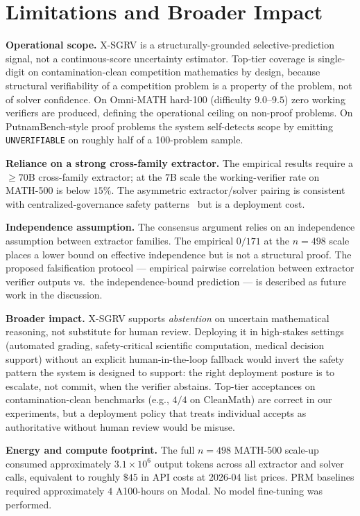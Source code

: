 \documentclass{article}
\begin{document}
\section{Limitations and Broader Impact}
\label{app:impact}

\textbf{Operational scope.} X-SGRV is a structurally-grounded selective-prediction signal, not a continuous-score uncertainty estimator. Top-tier coverage is single-digit on contamination-clean competition mathematics by design, because structural verifiability of a competition problem is a property of the problem, not of solver confidence. On Omni-MATH hard-100 (difficulty $9.0$--$9.5$) zero working verifiers are produced, defining the operational ceiling on non-proof problems. On PutnamBench-style proof problems the system self-detects scope by emitting \texttt{UNVERIFIABLE} on roughly half of a 100-problem sample.

\textbf{Reliance on a strong cross-family extractor.} The empirical results require a $\geq 70$B cross-family extractor; at the $7$B scale the working-verifier rate on MATH-500 is below $15\%$. The asymmetric extractor/solver pairing is consistent with centralized-governance safety patterns~\citep{ste2024,xiong2024llmuncertainty} but is a deployment cost.

\textbf{Independence assumption.} The consensus argument relies on an independence assumption between extractor families. The empirical $0/171$ at the $n{=}498$ scale places a lower bound on effective independence but is not a structural proof. The proposed falsification protocol --- empirical pairwise correlation between extractor verifier outputs vs.\ the independence-bound prediction --- is described as future work in the discussion.

\textbf{Broader impact.} X-SGRV supports \emph{abstention} on uncertain mathematical reasoning, not substitute for human review. Deploying it in high-stakes settings (automated grading, safety-critical scientific computation, medical decision support) without an explicit human-in-the-loop fallback would invert the safety pattern the system is designed to support: the right deployment posture is to escalate, not commit, when the verifier abstains. Top-tier acceptances on contamination-clean benchmarks (e.g., $4/4$ on CleanMath) are correct in our experiments, but a deployment policy that treats individual accepts as authoritative without human review would be misuse.

\textbf{Energy and compute footprint.} The full $n{=}498$ MATH-500 scale-up consumed approximately $3.1\times 10^6$ output tokens across all extractor and solver calls, equivalent to roughly $\$45$ in API costs at 2026-04 list prices. PRM baselines required approximately $4$ A100-hours on Modal. No model fine-tuning was performed.
\end{document}

